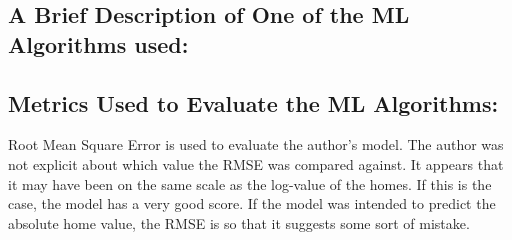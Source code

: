 \documentclass[]{article}
\begin{document}
\subsection*{A Brief Description of One of the ML Algorithms used:}

\subsection*{Metrics Used to Evaluate the ML Algorithms:}
Root Mean Square Error is used to evaluate the author's model. 
The author was not explicit about which value the RMSE was compared against. 
It appears that it may have been on the same scale as the log-value of the homes.
If this is the case, the model has a very good score.
If the model was intended to predict the absolute home value, the RMSE is so that it suggests some sort of mistake.
\end{document}
